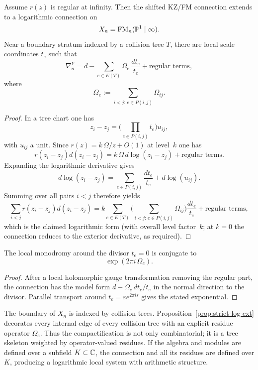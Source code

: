 \begin{proposition}%
Assume $r(z)$ is regular at infinity. Then the shifted KZ/FM connection extends to a logarithmic connection on
\[
 X_n=\mathrm{FM}_n(\mathbb P^1\mid\infty).
\]
Near a boundary stratum indexed by a collision tree $T$, there are local scale coordinates $t_e$ such that
\[
 \nabla_n^Y = d-\sum_{e\in E(T)} \Omega_e\,\frac{dt_e}{t_e}+\text{regular terms},
\]
where
\[
 \Omega_e:=\sum_{i<j:\,e\in P(i,j)}\Omega_{ij}.
\]
\end{proposition}

\begin{proof}
In a tree chart one has
\[
 z_i-z_j = \Big(\prod_{e\in P(i,j)}t_e\Big)u_{ij},
\]
with $u_{ij}$ a unit. Since $r(z)=k\,\Omega/z+O(1)$ at level~$k$ one has
\[
 r(z_i-z_j)d(z_i-z_j)=k\,\Omega\,d\log(z_i-z_j)+\text{regular terms}.
\]
Expanding the logarithmic derivative gives
\[
 d\log(z_i-z_j)=\sum_{e\in P(i,j)}\frac{dt_e}{t_e}+d\log(u_{ij}).
\]
Summing over all pairs $i<j$ therefore yields
\[
 \sum_{i<j}r(z_i-z_j)d(z_i-z_j)=k\sum_{e\in E(T)}\Big(\sum_{i<j:\,e\in P(i,j)}\Omega_{ij}\Big)\frac{dt_e}{t_e}+\text{regular terms},
\]
which is the claimed logarithmic form \textup{(}with overall level factor~$k$; at $k=0$ the connection reduces to the exterior derivative, as required\textup{)}.
\end{proof}

\begin{corollary}%
The local monodromy around the divisor $t_e=0$ is conjugate to
\[
 \exp(2\pi i\,\Omega_e).
\]
\end{corollary}

\begin{proof}
After a local holomorphic gauge transformation removing the regular part, the connection has the model form $d-\Omega_e\,dt_e/t_e$ in the normal direction to the divisor. Parallel transport around $t_e=\varepsilon e^{2\pi i s}$ gives the stated exponential.
\end{proof}

\begin{remark}
The boundary of $X_n$ is indexed by collision trees. Proposition~\ref{prop:strict-log-ext} decorates every internal edge of every collision tree with an explicit residue operator $\Omega_e$. Thus the compactification is not only combinatorial; it is a tree skeleton weighted by operator-valued residues. If the algebra and modules are defined over a subfield $K\subset\mathbb C$, the connection and all its residues are defined over $K$, producing a logarithmic local system with arithmetic structure.
\end{remark}


